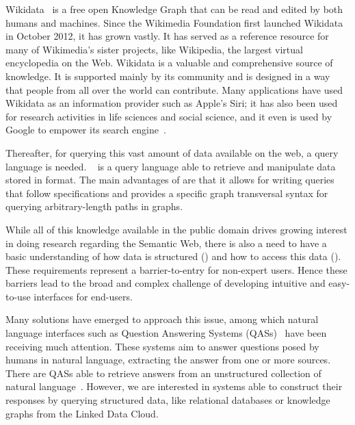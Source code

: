 Wikidata~\cite{KG:wikidata} is a free open Knowledge Graph that can be read and edited by both humans 
and machines. Since the Wikimedia Foundation first launched Wikidata in October 2012, it has grown 
vastly. It has served as a reference resource for many of Wikimedia’s sister 
projects, like Wikipedia, the largest virtual encyclopedia on the Web. Wikidata is a valuable 
and comprehensive source of knowledge. It is supported mainly by its community and is 
designed in a way that people from all over the world can contribute. Many applications have 
used Wikidata as an information provider such as Apple’s Siri; it has also been used for research 
activities in life sciences and social science, and it even is used by Google to empower its search 
engine~\cite{wikidata:usage-MalyshevKGGB18}.

Thereafter, for querying this vast amount of data available on the web, a query language is needed. 
\SPARQL{}~\cite{key:sparql11} is a query language able to retrieve and manipulate data stored in \RDF{} 
format. The main advantages of \SPARQL{} are that it allows for writing queries that follow \RDF{} 
specifications and provides a specific graph transversal syntax for querying arbitrary-length paths 
in graphs.

While all of this knowledge available in the public domain drives growing interest in doing 
research regarding the Semantic Web, there is also a need to have a basic understanding of 
how data is structured (\RDF) and how to access this data (\SPARQL). These requirements 
represent a barrier-to-entry for non-expert users. Hence these barriers lead to the broad and 
complex challenge of developing intuitive and easy-to-use interfaces for end-users.

Many solutions have emerged to approach this issue, among which natural language interfaces such as 
Question Answering Systems (QASs)~\cite{qa:survey-BOUZIANE2015366, qa:intro-UngerFC14, 
qa:nn-qakg-Chakraborty19} have been receiving much attention. These systems aim to answer questions 
posed by humans in natural language, extracting the answer from one or more sources. There are QASs 
able to retrieve answers from an unstructured collection of natural language~\cite{qa:survey-BOUZIANE2015366}. 
However, we are interested in systems able to construct their responses by querying structured data, 
like relational databases or knowledge graphs from the Linked Data Cloud.

